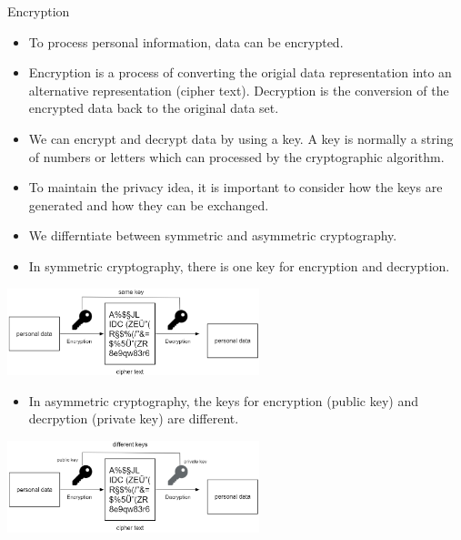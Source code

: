 \begin{vbframe}{Encryption}

\begin{itemize}

\item To process personal information, data can be encrypted. 

\item Encryption is a process of converting the origial data representation into an alternative representation (cipher text). Decryption is the conversion of the encrypted data back to the original data set. 

\item We can encrypt and decrypt data by using a key. A key is normally a string of numbers or letters which can processed by the cryptographic algorithm.

\item To maintain the privacy idea, it is important to consider how the keys are generated and how they can be exchanged.  

\end{itemize}

\framebreak
\begin{itemize}
\item We differntiate between symmetric and asymmetric cryptography.
\item In symmetric cryptography, there is one key for encryption and decryption. 
\end{itemize}
\vspace{-0.2cm}
\begin{center}
\includegraphics[width=0.55\textwidth]{figure_man/privacy-sym-encryp.png}
\end{center}
\vspace{-0.5cm}
\begin{itemize}
\item In asymmetric cryptography, the keys for encryption (public key) and decrpytion (private key) are different. 
\end{itemize}
\vspace{-0.2cm}
\begin{center}
\includegraphics[width=0.55\textwidth]{figure_man/privacy-asym-encryp.png}
\end{center}

\end{vbframe}
